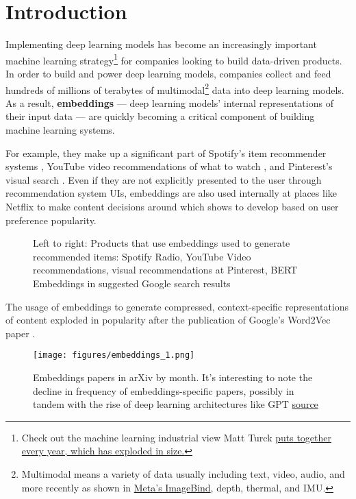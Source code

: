 \documentclass[11pt, table]{diazessay} %
\begin{document}
\begin{sloppypar}

\section{Introduction}

Implementing deep learning models has become an increasingly important machine learning strategy\footnote{Check out the machine learning industrial view Matt Turck \href{https://mattturck.com/mad2023/}{puts together every year, which has exploded in size.}} for companies looking to build data-driven products. In order to build and power deep learning models, companies collect and feed hundreds of millions of terabytes of multimodal\footnote{Multimodal means a variety of data usually including text, video, audio, and more recently as shown in \href{https://ai.facebook.com/blog/imagebind-six-modalities-binding-ai/}{Meta's ImageBind}, depth, thermal, and IMU.} data into deep learning models. As a result, \textbf{embeddings} --- deep learning models' internal representations of their input data --- are quickly becoming a critical component of building machine learning systems.

For example, they make up a significant part of Spotify's item recommender systems  \citep{hansen2020contextual}, YouTube video recommendations of what to watch  \citep{covington2016deep}, and Pinterest's visual search  \citep{jing2015visual}. Even if they are not explicitly presented to the user through recommendation system UIs, embeddings are also used internally at places like Netflix to make content decisions around which shows to develop based on user preference popularity.

\begin{figure}[H]
\caption{Left to right: Products that use embeddings used to generate recommended items: Spotify Radio, YouTube Video recommendations, visual recommendations at Pinterest, BERT Embeddings in suggested Google search results}
\end{figure}

The usage of embeddings to generate compressed, context-specific representations of content exploded in popularity after the publication of Google’s Word2Vec paper  \citep{mikolov2013efficient}.

\begin{figure}[H]
\centering
\texttt{[image: figures/embeddings\_1.png]}
\caption{Embeddings papers in arXiv by month. It's interesting to note the decline in frequency of embeddings-specific papers, possibly in tandem with the rise of deep learning architectures like GPT \href{https://github.com/veekaybee/what_are_embeddings/blob/main/notebooks/fig_2_embeddings_papers.ipynb}{source}}
\end{figure}


\end{sloppypar}
\end{document}
